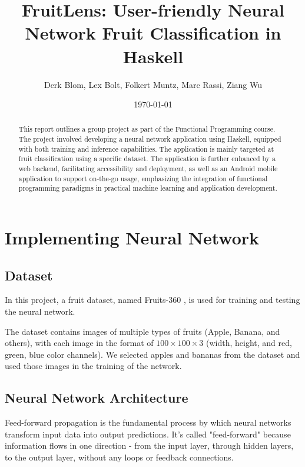 \documentclass[12pt,a4paper]{article}
\title{FruitLens: User-friendly Neural Network Fruit Classification in Haskell}
\author{Derk Blom, Lex Bolt, Folkert Muntz, Marc Rassi, Ziang Wu}
\date{\today}
\begin{document}
\maketitle

\begin{abstract}
This report outlines a group project as part of the Functional Programming course. The project involved developing a neural network application using Haskell, equipped with both training and inference capabilities. The application is mainly targeted at fruit classification using a specific dataset. The application is further enhanced by a web backend, facilitating accessibility and deployment, as well as an Android mobile application to support on-the-go usage, emphasizing the integration of functional programming paradigms in practical machine learning and application development.
\end{abstract}

\vfill

\tableofcontents

\clearpage


\section{Implementing Neural Network}

\subsection{Dataset}
In this project, a fruit dataset, named Fruits-360 \cite{oltean_fruits-360_2017}, is used for training and testing the neural network.

The dataset contains images of multiple types of fruits (Apple, Banana, and others), with each image in the format of $100 \times 100 \times 3$ (width, height, and red, green, blue color channels). We selected apples and bananas from the dataset and used those images in the training of the network.

% 

\subsection{Neural Network Architecture}
Feed-forward propagation is the fundamental process by which neural networks transform input data into output predictions. It's called "feed-forward" because information flows in one direction - from the input layer, through hidden layers, to the output layer, without any loops or feedback connections.
\end{document}
